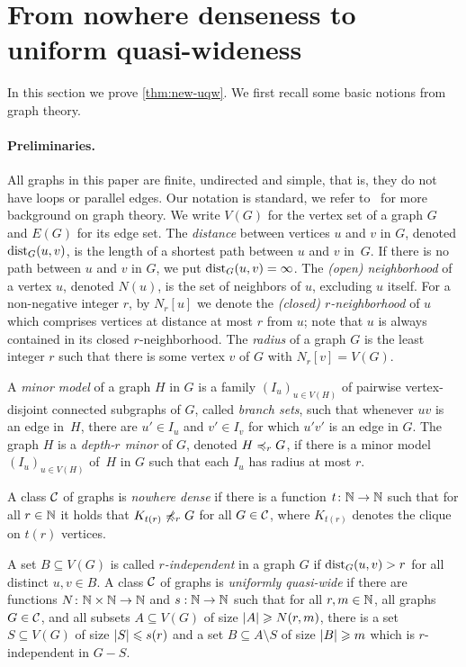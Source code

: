 \section{From nowhere denseness to uniform quasi-wideness}\label{sec:uqw}

In this section we prove \cref{thm:new-uqw}. 
We first recall some basic notions from graph theory. 

\paragraph*{Preliminaries.}
All graphs in this paper are finite, undirected and simple, that is, 
they do not have loops or parallel edges. Our notation is standard,
we refer to~\cite{diestel2012graph} for more background on 
graph theory. 
We write $V(G)$ for the vertex set of a graph $G$ and
$E(G)$ for its edge set. 
The {\em{distance}} between vertices $u$ and $v$ in $G$, denoted $\mathrm{dist}_G(u,v)$, is the length of a shortest path between $u$ and $v$ in~$G$.
If there is no path between $u$ and $v$ in $G$, we put $\mathrm{dist}_G(u,v)=\infty$.
The {\em{(open) neighborhood}} of a vertex $u$, denoted $N(u)$, is the set of neighbors of $u$, excluding $u$ itself.
For a non-negative integer $r$, by $N_r[u]$ we denote the {\em{(closed) $r$-neighborhood}} of $u$ which comprises vertices at distance at most $r$ from $u$; note that $u$ is always contained in its closed $r$-neighborhood. The \emph{radius} of a graph $G$ is the least integer $r$ such that there is some vertex $v$ of $G$ with $N_r[v]=V(G)$.


A {\em{minor model}} of a graph $H$ in $G$ is a family $(I_u)_{u\in V(H)}$ of pairwise vertex-disjoint connected subgraphs of $G$, called {\em{branch sets}},
such that whenever $uv$ is an edge in~$H$, there are $u'\in I_u$ and $v'\in I_v$ for which $u'v'$ 
is an edge in $G$.
The graph $H$ is a {\em{depth-$r$ minor}} of $G$, denoted $H\preccurlyeq_rG$, if there is a minor model
$(I_u)_{u\in V(H)}$ of~$H$ in $G$ such that each $I_u$ has radius at most $r$.

A class $\mathcal{C}$ of graphs is \emph{nowhere dense} if there is a function 
$t\colon \mathbb{N}\rightarrow \mathbb{N}$ such that for all $r\in \mathbb{N}$ it holds that $K_{t(r)}\not\preccurlyeq_r G$
for all $G\in \mathcal{C}$, where $K_{t(r)}$ denotes the clique on $t(r)$ vertices. 

A set $B\subseteq V(G)$ is called {\em{$r$-independent}} in a graph $G$ if  $\mathrm{dist}_G(u,v)>r$ for all
distinct $u,v\in B$.
A class $\mathcal{C}$ of graphs is \emph{uniformly quasi-wide} if there are
functions $N\colon \mathbb{N}\times\mathbb{N}\rightarrow \mathbb{N}$ and $s:\mathbb{N}\rightarrow \mathbb{N}$ such
that for all $r,m\in \mathbb{N}$, all graphs $G\in \mathcal{C}$, and all subsets $A\subseteq V(G)$ of size $\left\lvert A\right\rvert\geqslant N(r,m)$, there is a set
$S\subseteq V(G)$ of size $\left\lvert S\right\rvert\leqslant s(r)$ and a set
$B\subseteq A\setminus S$ of size $\left\lvert B\right\rvert\geqslant m$ which is $r$-independent in
$G-S$. 

